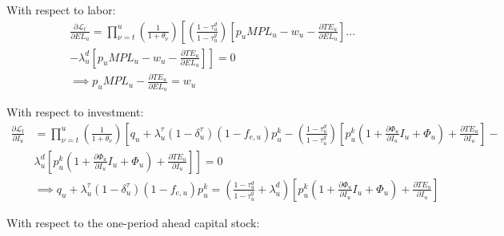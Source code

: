 With respect to labor:
\begin{equation}
\label{eqn:foc_l}
\begin{split}
&\frac{\partial \mathcal{L}_{t}}{\partial EL_{u}} = \prod_{\nu=t}^{u}\left(\frac{1}{1+\theta_{\nu}}\right)\left[ \left(\frac{1-\tau^{d}_{u}}{1-\tau^{g}_{u}}\right)\left[p_{u}MPL_{u} - w_{u} - \frac{\partial TE_{u}}{\partial EL_{u}}\right] ... \right. \\
& \left. - \lambda^{d}_{u}\left[p_{u}MPL_{u} - w_{u} - \frac{\partial TE_{u}}{\partial EL_{u}}\right] \right] = 0  \\
& \implies  p_{u}MPL_{u}- \frac{\partial TE_{u}}{\partial EL_{u}} = w_{u}
\end{split}
\end{equation}


With respect to investment:
 \begin{equation}
\label{eqn:foc_i}
\begin{split}
\frac{\partial \mathcal{L}_{t}}{\partial I_{u}} & =  \prod_{\nu=t}^{u}\left(\frac{1}{1+\theta_{\nu}}\right) \left[ q_{u} + \lambda^{\tau}_{u}(1-\delta^{\tau}_{u})(1-f_{e,u})p^{k}_{u} -  \left(\frac{1-\tau^{d}_{u}}{1-\tau^{g}_{u}}\right) \left[p^{k}_{u}(1+ \frac{\partial \Phi_{u}}{\partial I_{u}}I_{u} + \Phi_{u}) + \frac{\partial TE_{u}}{\partial I_{u}} \right] - \right. \\
& \left. \lambda^{d}_{u}\left[p^{k}_{u}(1+ \frac{\partial \Phi_{u}}{\partial I_{u}}I_{u} + \Phi_{u}) + \frac{\partial TE_{u}}{\partial I_{u}} \right]\right]= 0 \\
& \implies q_{u} + \lambda^{\tau}_{u}(1-\delta^{\tau}_{u})(1-f_{e,u})p^{k}_{u} =  \left(\frac{1-\tau^{d}_{u}}{1-\tau^{g}_{u}} + \lambda^{d}_{u}\right)\left[p^{k}_{u}(1+ \frac{\partial \Phi_{u}}{\partial I_{u}}I_{u} + \Phi_{u}) + \frac{\partial TE_{u}}{\partial I_{u}}\right]
\end{split}
\end{equation}

With respect to the one-period ahead capital stock:


